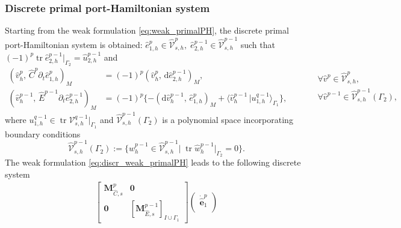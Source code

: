 \documentclass{elsarticle}
\renewcommand\d{\ensuremath{\mathrm{d}}}
\DeclareMathOperator{\tr}{tr}
\newcommand*{\dual}[1]{\ensuremath{\widehat{#1}}}
\newcommand{\inpr}[3][]{\ensuremath{( #2, \, #3 )_{#1}}}
\newcommand{\dualpr}[3][]{\ensuremath{\langle #2 \, \vert #3 \rangle_{#1}}}
\begin{document}
{\subsubsection{Discrete primal port-Hamiltonian system}
Starting from the weak formulation \eqref{eq:weak_primalPH}, the discrete primal port-Hamiltonian system is obtained: $\dual{e}^p_{1, h} \in \dual{\mathcal{V}}^{p}_{s, h}, \; \dual{e}^{p-1}_{2, h} \in \dual{\mathcal{V}}^{p-1}_{s, h}$ such that $(-1)^p \tr \dual{e}^{p-1}_{2, h} \vert_{\Gamma_2} = \dual{u}^{p-1}_{2, h}$ and
 \begin{equation}\label{eq:discr_weak_primalPH}
    \begin{aligned}
    \inpr[M]{\dual{v}^p_h}{\dual{C}^p \partial_t \dual{e}^p_{1, h}} &= (-1)^{p}\inpr[M]{\dual{v}^p_h}{\d \dual{e}^{p-1}_{2, h}}, \\
     \inpr[M]{\dual{v}^{p-1}_h}{\dual{E}^{p-1} \partial_t \dual{e}^{p-1}_{2, h}} &= (-1)^{p} \{- \inpr[M]{\d\dual{v}^{p-1}_h}{\dual{e}^p_{1, h}} + \dualpr[\Gamma_1]{\dual{v}^{p-1}_h}{u^{q-1}_{1, h}}\},
    \end{aligned}  \qquad 
    \begin{aligned}
    &\forall \dual{v}^p \in \dual{\mathcal{V}}^p_{s, h}, \\
    &\forall \dual{v}^{p-1} \in \dual{\mathcal{V}}^{p-1}_{s, h}(\Gamma_2), \\
    \end{aligned}
 \end{equation}
where $u_{1, h}^{q-1} \in \tr {\mathcal{V}}^{q-1}_{s, h}|_{\Gamma_1}$ and $\dual{\mathcal{V}}^{p-1}_{s, h}(\Gamma_2)$ is a polynomial space incorporating boundary conditions
\begin{equation}
        \dual{\mathcal{V}}^{p-1}_{s, h}(\Gamma_2) := \{\dual{w}^{p-1}_h \in \dual{\mathcal{V}}^{p-1}_{s, h} \vert \; \tr \dual{w}^{p-1}_h\vert_{\Gamma_2} = 0 \}. 
\end{equation}
The weak formulation \eqref{eq:discr_weak_primalPH} leads to the following discrete system
\begin{equation}\label{eq:alg_primalPH}
\begin{aligned}
    \begin{bmatrix}
        \mathbf{M}^p_{\dual{C}, s} & \mathbf{0} \\
        \mathbf{0} & [\mathbf{M}^{p-1}_{\dual{E}, s}]_{I \cup \Gamma_1}
    \end{bmatrix}
    \begin{pmatrix}
    \dot{\dual{\mathbf{e}}}^p_1 \\

\end{pmatrix}
\end{aligned}
\end{equation}}
\end{document}
